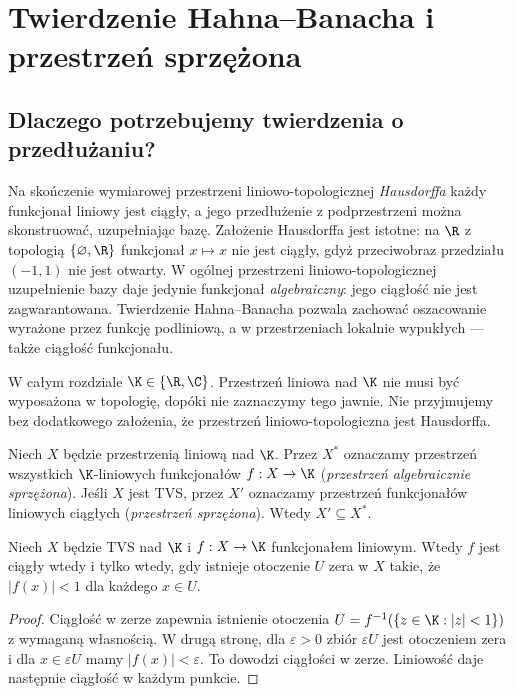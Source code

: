 \setcounter{section}{5}
\section{Twierdzenie Hahna--Banacha i przestrzeń sprzężona}\label{sec:hahn-banach}

\providecommand{\atlasref}[2]{#2}


\subsection{Dlaczego potrzebujemy twierdzenia o przedłużaniu?}

Na skończenie wymiarowej przestrzeni liniowo-topologicznej
\emph{Hausdorffa} każdy funkcjonał liniowy jest ciągły, a jego
przedłużenie z podprzestrzeni można skonstruować, uzupełniając bazę.
Założenie Hausdorffa jest istotne: na $\R$ z topologią
$\{\varnothing,\R\}$ funkcjonał $x\mapsto x$ nie jest ciągły,
gdyż przeciwobraz przedziału $(-1,1)$ nie jest otwarty.
W ogólnej przestrzeni liniowo-topologicznej uzupełnienie bazy daje
jedynie funkcjonał \emph{algebraiczny}: jego ciągłość nie jest
zagwarantowana. Twierdzenie Hahna--Banacha pozwala zachować
oszacowanie wyrażone przez funkcję podliniową, a w przestrzeniach
lokalnie wypukłych --- także ciągłość funkcjonału.

W całym rozdziale $\K\in\{\R,\C\}$. Przestrzeń liniowa nad $\K$
nie musi być wyposażona w topologię, dopóki nie zaznaczymy tego
jawnie. Nie przyjmujemy bez dodatkowego założenia, że przestrzeń
liniowo-topologiczna jest Hausdorffa.

\begin{definicja}\label{def:dual-topological}
Niech $X$ będzie przestrzenią liniową nad $\K$. Przez $X^*$
oznaczamy przestrzeń wszystkich $\K$-liniowych funkcjonałów
$f:X\to\K$ (\emph{przestrzeń algebraicznie sprzężona}). Jeśli $X$ jest TVS,
przez $X'$ oznaczamy przestrzeń funkcjonałów liniowych ciągłych
(\emph{przestrzeń sprzężona}). Wtedy $X'\subseteq X^*$.
\end{definicja}

\begin{stwierdzenie}
\label{prop:dual-continuity}
Niech $X$ będzie TVS nad $\K$ i $f:X\to\K$ funkcjonałem
liniowym. Wtedy $f$ jest ciągły wtedy i tylko wtedy, gdy
istnieje otoczenie $U$ zera w $X$ takie, że $|f(x)|<1$
dla każdego $x\in U$.
\end{stwierdzenie}
\begin{proof}
Ciągłość w zerze zapewnia istnienie otoczenia
$U=f^{-1}(\{z\in\K:|z|<1\})$ z wymaganą własnością.
W drugą stronę, dla $\varepsilon>0$ zbiór
$\varepsilon U$ jest otoczeniem zera i dla $x\in\varepsilon U$
mamy $|f(x)|<\varepsilon$. To dowodzi ciągłości w zerze.
Liniowość daje następnie ciągłość w każdym punkcie.
\end{proof}

